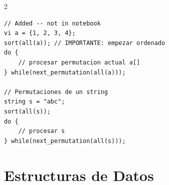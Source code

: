 \documentclass[10pt,a4paper]{article}
\begin{document}
\begin{multicols}{2}
\begin{lstlisting}
// Added -- not in notebook
vi a = {1, 2, 3, 4};
sort(all(a)); // IMPORTANTE: empezar ordenado
do {
    // procesar permutacion actual a[]
} while(next_permutation(all(a)));

// Permutaciones de un string
string s = "abc";
sort(all(s));
do {
    // procesar s
} while(next_permutation(all(s)));
\end{lstlisting}

\end{multicols}
\newpage

\section{Estructuras de Datos}
\end{document}
